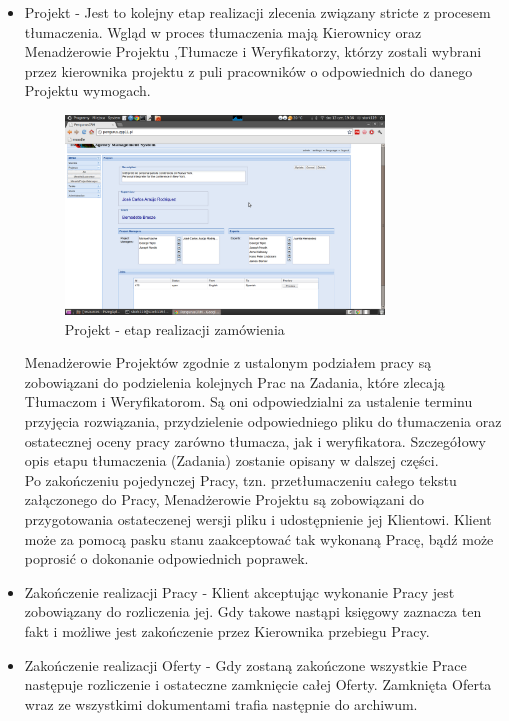 \documentclass[licencjacka]{pracamgr}
\begin{document}
\begin{itemize}
\item Projekt - Jest to kolejny etap realizacji zlecenia związany stricte z procesem tłumaczenia. Wgląd w proces tłumaczenia mają Kierownicy oraz Menadżerowie Projektu ,Tłumacze i Weryfikatorzy, którzy zostali wybrani przez kierownika projektu z puli pracowników o odpowiednich do danego Projektu wymogach.\\
\begin{figure}[h!]
\centering
\includegraphics[width=0.8\textwidth]{resources/project.png}
\caption{Projekt - etap realizacji zamówienia}
\end{figure}
 
Menadżerowie Projektów zgodnie z ustalonym podziałem pracy są zobowiązani do podzielenia kolejnych Prac na Zadania, które zlecają Tłumaczom i Weryfikatorom. Są oni odpowiedzialni za ustalenie terminu przyjęcia rozwiązania, przydzielenie odpowiedniego pliku do tłumaczenia oraz ostatecznej oceny pracy zarówno tłumacza, jak i weryfikatora. Szczegółowy opis etapu tłumaczenia (Zadania) zostanie opisany w dalszej części.\\
Po zakończeniu pojedynczej Pracy, tzn. przetłumaczeniu całego tekstu załączonego do Pracy, Menadżerowie Projektu są zobowiązani do przygotowania ostateczenej wersji pliku i udostępnienie jej Klientowi. Klient może za pomocą pasku stanu zaakceptować tak wykonaną Pracę, bądź może poprosić o dokonanie odpowiednich poprawek.

\item Zakończenie  realizacji Pracy - Klient akceptując wykonanie Pracy jest zobowiązany do rozliczenia jej. Gdy takowe nastąpi księgowy zaznacza ten fakt i możliwe jest zakończenie przez Kierownika przebiegu Pracy. 
\item Zakończenie  realizacji Oferty - Gdy zostaną zakończone wszystkie Prace następuje rozliczenie i ostateczne zamknięcie całej Oferty. Zamknięta Oferta wraz ze wszystkimi dokumentami trafia następnie do archiwum. 
\end{itemize}  
\end{document}

